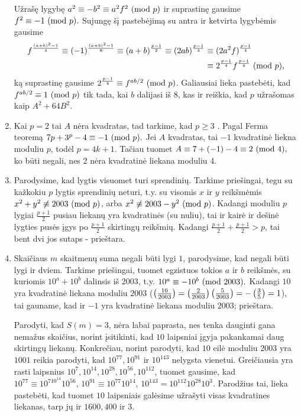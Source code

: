 \begin{enumerate}
Užrašę lygybę $a^2 \equiv -b^2 \equiv a^2f^2 \ (\text{mod } p)$ ir suprastinę
gausime $f^2\equiv -1 \ (\text{mod } p).$ Sujungę šį pastebėjimą su antra ir
ketvirta lygybėmis gausime 
\begin{align*}
f^\frac{(a+b)^2 - 1}{4}\equiv (-1)^\frac{(a+b)^2 - 1}{8}\equiv
(a+b)^\frac{p-1}{2} \equiv (2ab)^\frac{p-1}{4} & \equiv
(2a^2f)^\frac{p-1}{4} \\ &\equiv 2^\frac{p-1}{4} f^\frac{p-1}{4}
\ (\text{mod } p), 
\end{align*}
ką suprastinę gausime $2^\frac{p-1}{4} \equiv f^{ab/2}
\ (\text{mod } p)$. Galiausiai lieka pastebėti, kad $f^{ab/2} \equiv 1 \ (\text{mod } p)$ tik
tada, kai $b$ dalijasi iš $8$, kas ir reiškia, kad $p$ užrašomas kaip
$A^2 + 64B^2.$
\item 
Kai $p=2$ tai $A$ nėra kvadratas, tad tarkime, kad $p\geq 3$ . Pagal
Ferma teoremą $7p + 3^p - 4\equiv -1 \ (\text{mod } p).$ Jei $A$ kvadratas, tai
$-1$ kvadratinė liekna moduliu $p$, todėl $p=4k+1$. Tačiau tuomet
$A \equiv 7+(-1)-4 \equiv 2 \ (\text{mod } 4),$ ko būti negali, nes 2 nėra
kvadratinė liekana moduliu 4. 
\item 
Parodysime, kad lygtis visuomet turi sprendinių. Tarkime priešingai,
tegu su kažkokiu $p$ lygtis sprendinių neturi, t.y. su visomis $x$ ir
$y$ reikšmėmis $x^2 + y^2 \not \equiv 2003 \ (\text{mod } p)$, arba $x^2 \not
\equiv 2003-y^2 \ (\text{mod } p)$. Kadangi moduliu $p$ lygiai $\frac{p+1}{2}$
pusiau liekanų yra kvadratinės (su nuliu), tai ir kairė ir dešinė
lygties pusės įgys po $\frac{p+1}{2}$ skirtingų reikšmių. Kadangi
$\frac{p+1}{2} + \frac{p+1}{2} > p$, tai bent dvi jos sutaps -
prieštara.
\item 
Skaičiaus $m$ skaitmenų suma negali būti lygi $1$, parodysime, kad
negali būti lygi ir dviem. Tarkime priešingai, tuomet egzistuos tokios
$a$ ir $b$ reikšmės, su kuriomis $10^a + 10^b$ dalinsis iš $2003$, t.y.
$10^a \equiv -10^b \ (\text{mod } 2003).$ Kadangi $10$ yra kvadratinė liekana
moduliu $2003$ ($\left(\frac{10}{2003}\right) = \left(\frac{2}{2003}\right)\left(\frac{5}{2003}\right) =
-\left(\frac{3}{5}\right) = 1$), tai gauname, kad ir $-1$ yra kvadratinė liekana
moduliu $2003$; prieštara. 

Parodyti, kad $S(m)=3$, nėra labai paprasta, nes tenka
dauginti gana nemažus skaičius, norint įsitikinti, kad $10$ laipsniai
įgyja pakankamai daug skirtingų liekanų. Konkrečiau, norint parodyti,
kad $10$ eilė moduliu $2003$ yra $1001$ reikia parodyti, kad
$10^{77}, 10^{91}$ ir $10^{143}$ nelygsta vienetui. Greičiausia yra
rasti laipsnius $10^7, 10^{14}, 10^{28}, 10^{56}, 10^{112}$, tuomet
gausime, kad $10^{77} \equiv 10^710^{14}10^{56}$, $10^{91} \equiv
10^{77}10^{14}$, $10^{143} = 10^{112}10^{28}10^3$. 
Parodžius tai, lieka pastebėti, kad tuomet $10$ laipsniais galėsime
užrašyti visas kvadratines liekanas, tarp jų ir $1600, 400$ ir
$3$.
\end{enumerate} 
